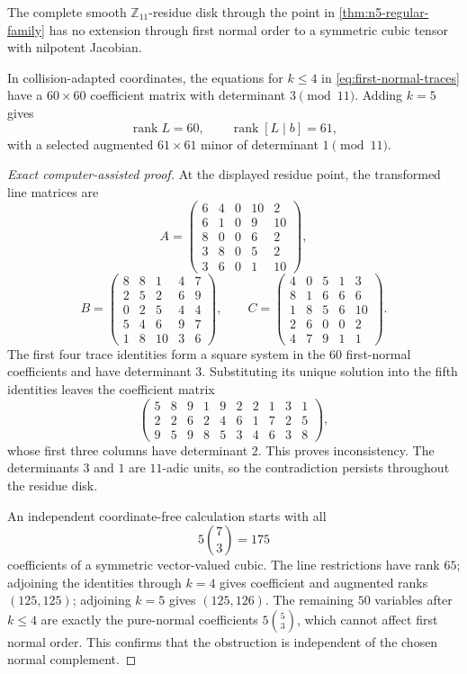 \begin{theorem}
\label{thm:n5-first-normal}
The complete smooth \(\mathbb Z_{11}\)-residue disk through the point in
\cref{thm:n5-regular-family} has no extension through first normal order to
a symmetric cubic tensor with nilpotent Jacobian.

In collision-adapted coordinates, the equations for \(k\le4\) in
\eqref{eq:first-normal-traces} have a \(60\times60\) coefficient matrix
with determinant \(3\pmod {11}\).  Adding \(k=5\) gives
\[
\operatorname{rank}L=60,\qquad
\operatorname{rank}[L\mid b]=61,
\]
with a selected augmented \(61\times61\) minor of determinant
\(1\pmod {11}\).
\end{theorem}

\begin{proof}[Exact computer-assisted proof]
At the displayed residue point, the transformed line matrices are
\[
A=\begin{pmatrix}
6&4&0&10&2\\6&1&0&9&10\\8&0&0&6&2\\
3&8&0&5&2\\3&6&0&1&10
\end{pmatrix},
\]
\[
B=\begin{pmatrix}
8&8&1&4&7\\2&5&2&6&9\\0&2&5&4&4\\
5&4&6&9&7\\1&8&10&3&6
\end{pmatrix},
\qquad
C=\begin{pmatrix}
4&0&5&1&3\\8&1&6&6&6\\1&8&5&6&10\\
2&6&0&0&2\\4&7&9&1&1
\end{pmatrix}.
\]
The first four trace identities form a square system in the \(60\)
first-normal coefficients and have determinant \(3\).  Substituting its
unique solution into the fifth identities leaves the coefficient matrix
\[
\begin{pmatrix}
5&8&9&1&9&2&2&1&3&1\\
2&2&6&2&4&6&1&7&2&5\\
9&5&9&8&5&3&4&6&3&8
\end{pmatrix},
\]
whose first three columns have determinant \(2\).  This proves
inconsistency.  The determinants \(3\) and \(1\) are \(11\)-adic units, so
the contradiction persists throughout the residue disk.

An independent coordinate-free calculation starts with all
\[
5\binom73=175
\]
coefficients of a symmetric vector-valued cubic.  The line restrictions
have rank \(65\); adjoining the identities through \(k=4\) gives
coefficient and augmented ranks \((125,125)\); adjoining \(k=5\) gives
\((125,126)\).  The remaining \(50\) variables after \(k\le4\) are exactly
the pure-normal coefficients \(5\binom53\), which cannot affect first
normal order.  This confirms that the obstruction is independent of the
chosen normal complement.
\end{proof}

